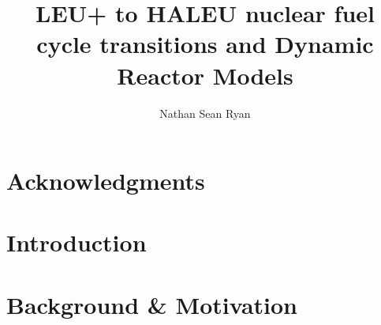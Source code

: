 \documentclass[edeposit,fullpage]{uiucthesis2018}
\title{LEU+ to HALEU nuclear fuel cycle transitions and Dynamic Reactor Models}
\author{Nathan Sean Ryan}
\begin{document}
\maketitle

\frontmatter
\begin{abstract}


\glsresetall

\end{abstract}

\chapter*{Acknowledgments}




\tableofcontents
\listoftables
\listoffigures


\pagebreak
\mainmatter

\chapter{Introduction}
\label{ch:introduction}
\glsresetall




\chapter{Background \& Motivation}
\label{ch:background}
\glsresetall
\end{document}
